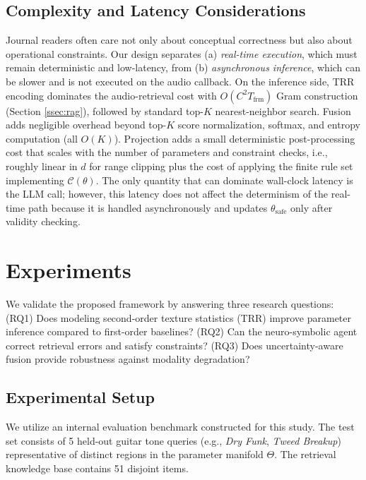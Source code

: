 \documentclass{article}
\begin{document}
\subsection{Complexity and Latency Considerations}
\label{ssec:complexity_latency}
Journal readers often care not only about conceptual correctness but also about operational constraints. Our design separates (a) \textit{real-time execution}, which must remain deterministic and low-latency, from (b) \textit{asynchronous inference}, which can be slower and is not executed on the audio callback.
On the inference side, TRR encoding dominates the audio-retrieval cost with $O(C^2 T_{\text{frm}})$ Gram construction (Section \ref{ssec:rag}), followed by standard top-$K$ nearest-neighbor search. Fusion adds negligible overhead beyond top-$K$ score normalization, softmax, and entropy computation (all $O(K)$). Projection adds a small deterministic post-processing cost that scales with the number of parameters and constraint checks, i.e., roughly linear in $d$ for range clipping plus the cost of applying the finite rule set implementing $\mathcal{C}(\theta)$. The only quantity that can dominate wall-clock latency is the LLM call; however, this latency does not affect the determinism of the real-time path because it is handled asynchronously and updates $\theta_{\text{safe}}$ only after validity checking.

\section{Experiments}
\label{sec:experiments}

We validate the proposed framework by answering three research questions: (RQ1) Does modeling second-order texture statistics (TRR) improve parameter inference compared to first-order baselines? (RQ2) Can the neuro-symbolic agent correct retrieval errors and satisfy constraints? (RQ3) Does uncertainty-aware fusion provide robustness against modality degradation?

\subsection{Experimental Setup}

We utilize an internal evaluation benchmark constructed for this study. The test set consists of 5 held-out guitar tone queries (e.g., \textit{Dry Funk}, \textit{Tweed Breakup}) representative of distinct regions in the parameter manifold $\Theta$. The retrieval knowledge base contains 51 disjoint items.
\end{document}
